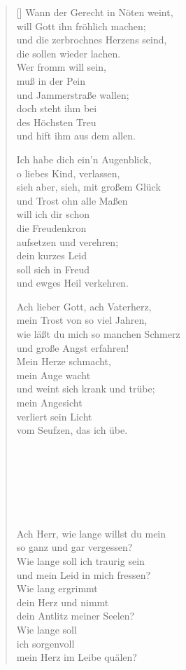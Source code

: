 \begin{multicols}{2}
\begin{verse}[\versewidth]
 Wann der Gerecht in Nöten weint,\\
will Gott ihn fröhlich machen;\\
und die zerbrochnes Herzens seind,\\
die sollen wieder lachen.\\
Wer fromm will sein,\\
muß in der Pein\\
und Jammerstraße wallen;\\
doch steht ihm bei\\
des Höchsten Treu\\
und hift ihm aus dem allen.

 Ich habe dich ein'n Augenblick,\\
o liebes Kind, verlassen,\\
sieh aber, sieh, mit großem Glück\\
und Trost ohn alle Maßen\\
will ich dir schon\\
die Freudenkron\\
aufsetzen und verehren;\\
dein kurzes Leid\\
soll sich in Freud\\
und ewges Heil verkehren.

 Ach lieber Gott, ach Vaterherz,\\
mein Trost von so viel Jahren,\\
wie läßt du mich so manchen Schmerz\\
und große Angst erfahren!\\
Mein Herze schmacht,\\
mein Auge wacht\\
und weint sich krank und trübe;\\
mein Angesicht\\
verliert sein Licht\\
vom Seufzen, das ich übe.

\begin{verbatim}







\end{verbatim}

 Ach Herr, wie lange willst du mein\\
so ganz und gar vergessen?\\
Wie lange soll ich traurig sein\\
und mein Leid in mich fressen?\\
Wie lang ergrimmt\\
dein Herz und nimmt\\
dein Antlitz meiner Seelen?\\
Wie lange soll\\
ich sorgenvoll\\
mein Herz im Leibe quälen?


\end{verse}
\end{multicols}
